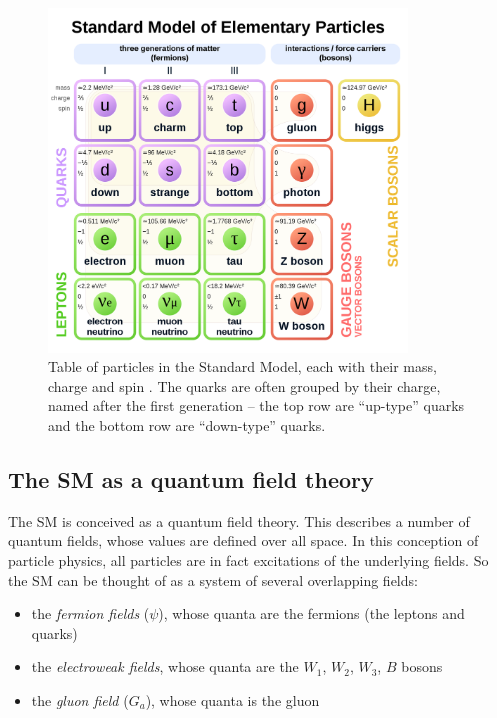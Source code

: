 \begin{figure}[h]
	\centering
	\includegraphics[width=0.85\textwidth]{../Pictures/StandardModel.png}
	\caption{Table of particles in the Standard Model, each with their mass, charge and spin \cite{standard-model-table}. The quarks are often grouped by their charge, named after the first generation -- the top row are ``up-type'' quarks and the bottom row are ``down-type'' quarks.}
	\label{figure:colliders/SM}
\end{figure}

\subsection{The \acrlong{SM} as a quantum field theory}
The \acrlong{SM} is conceived as a quantum field theory. This describes a number of quantum fields, whose values are defined over all space. In this conception of particle physics, all particles are in fact excitations of the underlying fields. So the \acrlong{SM} can be thought of as a system of several overlapping fields:

\begin{itemize}
	\item the \textit{fermion fields} ($\psi$), whose quanta are the fermions (the leptons and quarks)
	\item the \textit{electroweak fields}, whose quanta are the $W_1$, $W_2$, $W_3$, $B$ bosons 
	\item the \textit{gluon field} ($G_a$), whose quanta is the gluon
\end{itemize}

